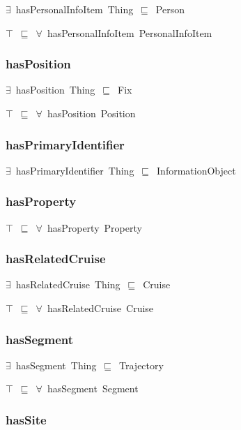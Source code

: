 \documentclass{article}
\begin{document}
\ensuremath{\exists}~hasPersonalInfoItem~Thing~\ensuremath{\sqsubseteq}~Person

\ensuremath{\top}~\ensuremath{\sqsubseteq}~\ensuremath{\forall}~hasPersonalInfoItem~PersonalInfoItem

\subsubsection*{hasPosition}

\ensuremath{\exists}~hasPosition~Thing~\ensuremath{\sqsubseteq}~Fix

\ensuremath{\top}~\ensuremath{\sqsubseteq}~\ensuremath{\forall}~hasPosition~Position

\subsubsection*{hasPrimaryIdentifier}

\ensuremath{\exists}~hasPrimaryIdentifier~Thing~\ensuremath{\sqsubseteq}~InformationObject

\subsubsection*{hasProperty}

\ensuremath{\top}~\ensuremath{\sqsubseteq}~\ensuremath{\forall}~hasProperty~Property

\subsubsection*{hasRelatedCruise}

\ensuremath{\exists}~hasRelatedCruise~Thing~\ensuremath{\sqsubseteq}~Cruise

\ensuremath{\top}~\ensuremath{\sqsubseteq}~\ensuremath{\forall}~hasRelatedCruise~Cruise

\subsubsection*{hasSegment}

\ensuremath{\exists}~hasSegment~Thing~\ensuremath{\sqsubseteq}~Trajectory

\ensuremath{\top}~\ensuremath{\sqsubseteq}~\ensuremath{\forall}~hasSegment~Segment

\subsubsection*{hasSite}
\end{document}
